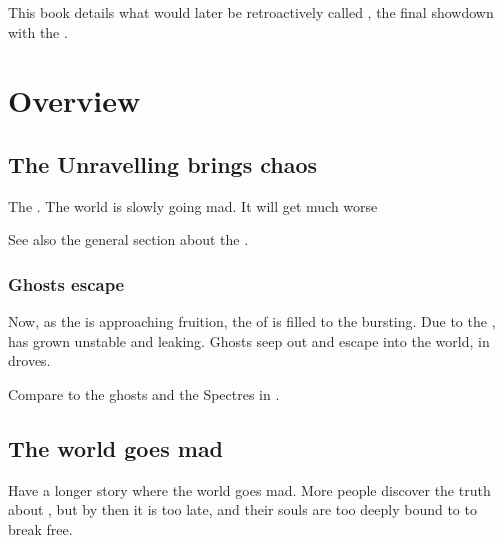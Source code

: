 This book details what would later be retroactively called \thirdbanewar, the final showdown with the \banes. 















\section{Overview}









\subsection{The Unravelling brings chaos}
The . 
The world is slowly going mad. 
It will get much worse\prikker

See also the general section about the . 





\subsubsection{Ghosts escape}
Now, as the  is approaching fruition, the \carcer{} of \Iquin{} is filled to the bursting. 
Due to the , \Iquin{} has grown unstable and leaking. 
Ghosts seep out and escape into the world, in droves. 

Compare to the ghosts and the Spectres in \cite{PhillipPullman:HisDarkMaterials}. 









\subsection{The world goes mad}
Have a longer story where the world goes mad. 
More people discover the truth about \iquin, but by then it is too late, and their souls are too deeply bound to \iquin to break free. 

